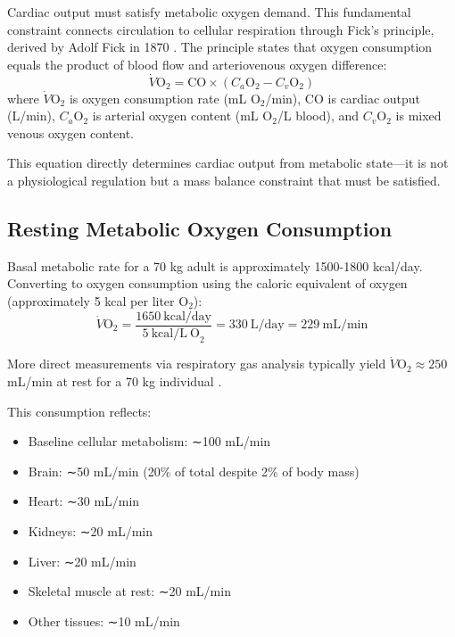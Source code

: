 \documentclass[12pt,a4paper]{article}
\theoremstyle{remark}
\begin{document}
Cardiac output must satisfy metabolic oxygen demand. This fundamental constraint connects circulation to cellular respiration through Fick's principle, derived by Adolf Fick in 1870 \cite{fick1870diffusion}. The principle states that oxygen consumption equals the product of blood flow and arteriovenous oxygen difference:
\begin{equation}
\dot{V}\mathrm{O}_{2} = \mathrm{CO} \times (C_{a}\mathrm{O}_{2} - C_{v}\mathrm{O}_{2})
\label{eq:fick}
\end{equation}
where $\dot{V}\mathrm{O}_{2}$ is oxygen consumption rate (mL O$_{2}$/min), CO is cardiac output (L/min), $C_{a}\mathrm{O}_{2}$ is arterial oxygen content (mL O$_{2}$/L blood), and $C_{v}\mathrm{O}_{2}$ is mixed venous oxygen content.

This equation directly determines cardiac output from metabolic state—it is not a physiological regulation but a mass balance constraint that must be satisfied.

\subsection{Resting Metabolic Oxygen Consumption}

Basal metabolic rate for a 70 kg adult is approximately 1500-1800 kcal/day. Converting to oxygen consumption using the caloric equivalent of oxygen (approximately 5 kcal per liter O$_{2}$):
\begin{equation}
\dot{V}\mathrm{O}_{2} = \frac{1650~\mathrm{kcal/day}}{5~\mathrm{kcal/L~O}_{2}} = 330~\mathrm{L/day} = 229~\mathrm{mL/min}
\end{equation}

More direct measurements via respiratory gas analysis typically yield $\dot{V}\mathrm{O}_{2} \approx 250$ mL/min at rest for a 70 kg individual \cite{weir1949new}.

This consumption reflects:
\begin{itemize}
\item Baseline cellular metabolism: ∼100 mL/min
\item Brain: ∼50 mL/min (20\% of total despite 2\% of body mass)
\item Heart: ∼30 mL/min
\item Kidneys: ∼20 mL/min
\item Liver: ∼20 mL/min
\item Skeletal muscle at rest: ∼20 mL/min
\item Other tissues: ∼10 mL/min
\end{itemize}
\end{document}
